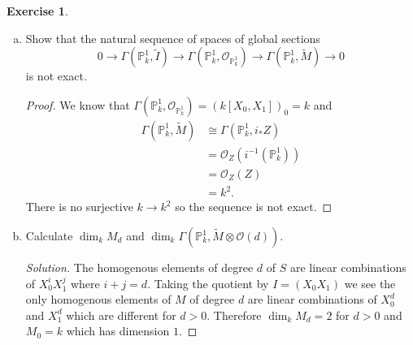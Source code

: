 \documentclass{article}
\renewcommand{\qedsymbol}{\raisebox{-0.5cm}{}}
\newcommand{\proj}{\mathbb{P}}
\newcommand{\sheaf}{\mathcal{O}}
\newenvironment{solution}{\begin{proof}[Solution]\renewcommand\qedsymbol{}}{\end{proof}}
\theoremstyle{definition}
\newtheorem{question}{Exercise}
\begin{document}
\begin{question}
\begin{enumerate}[(a)]
\begin{proof}
                  This is a sheaf on two components, so the global sections are
                  given by the product of the sections on the two components of
                  \(Z\) so the ring of global sections is the reduced ring
                  \(k\times k=k^{2}\). We will use this in the next part.
              \end{proof}

        \item Show that the natural sequence of spaces of global sections
              \[
                  0\to\Gamma(\proj^{1}_{k},\tilde{I})\to\Gamma(\proj^{1}_{k},\sheaf_{\proj^{1}_{k}})\to\Gamma(\proj^{1}_{k},\tilde{M})\to 0
              \]
              is not exact.

              \begin{proof}
                  We know that
                  \(\Gamma(\proj^{1}_{k},\sheaf_{\proj^{1}_{k}})=(k[X_{0},X_{1}])_{0}=k\)
                  and
                  \begin{align*}
                      \Gamma(\proj^{1}_{k},\tilde{M}) & \cong\Gamma(\proj^{1}_{k},i_{*}Z)  \\
                                                      & =\sheaf_{Z}(i^{-1}(\proj^{1}_{k})) \\
                                                      & =\sheaf_{Z}(Z)                     \\
                                                      & =k^{2}.
                  \end{align*}
                  There is no surjective \(k\to k^{2}\) so the sequence is not
                  exact.
              \end{proof}

        \item Calculate \(\dim_{k}M_{d}\) and
              \(\dim_{k}\Gamma(\proj^{1}_{k},\tilde{M}\otimes\sheaf(d))\).

              \begin{solution}
                  The homogenous elements of degree \(d\) of \(S\) are linear
                  combinations of \(X_{0}^{i}X_{1}^{j}\) where \(i+j=d\). Taking
                  the quotient by \(I=(X_{0}X_{1})\) we see the only homogenous
                  elements of \(M\) of degree \(d\) are linear combinations of
                  \(X_{0}^{d}\) and \(X_{1}^{d}\) which are different for
                  \(d>0\). Therefore \(\dim_{k}M_{d}=2\) for \(d>0\) and
                  \(M_{0}=k\) which has dimension \(1\).


\end{solution}
\end{enumerate}
\end{question}
\end{document}

